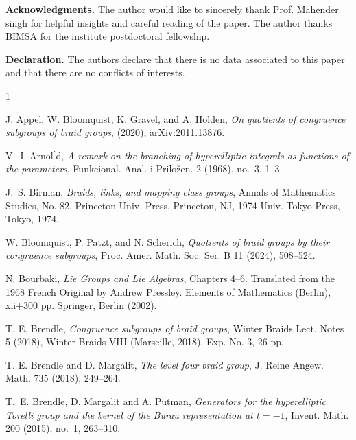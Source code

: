 \documentclass[12pt]{amsart}
\theoremstyle{definition}
\numberwithin{equation}{section}
\begin{document}
\medskip

\noindent\textbf{Acknowledgments.}
The author would like to sincerely thank Prof. Mahender singh for helpful insights and careful reading of the paper. The author thanks BIMSA for the institute postdoctoral fellowship.
\medskip



\noindent\textbf{Declaration.}
The authors declare that there is no data associated to this paper and that there are no conflicts of interests.
\medskip





\begin{thebibliography}{1}

 J. Appel, W. Bloomquist,  K. Gravel, and A. Holden, {\it On quotients of congruence subgroups of braid groups}, (2020), arXiv:2011.13876.

  V.~I. Arnol$^\prime$d, {\it A remark on the branching of hyperelliptic integrals as functions of the parameters}, Funkcional. Anal. i Prilo\v zen.  2 (1968), no.~3, 1--3.


 J.~S. Birman, {\it Braids, links, and mapping class groups}, Annals of Mathematics Studies, No. 82, Princeton Univ. Press, Princeton, NJ, 1974 Univ. Tokyo Press, Tokyo, 1974.

 W. Bloomquist, P. Patzt, and N. Scherich, {\it Quotients of braid groups by their congruence subgroups}, Proc. Amer. Math. Soc. Ser. B 11 (2024), 508--524.


 N. Bourbaki, {\it Lie Groups and Lie Algebras}, Chapters 4--6. Translated from the 1968 French Original by Andrew Pressley. Elements of Mathematics (Berlin), xii+300 pp. Springer, Berlin (2002).

 T. E. Brendle, {\it Congruence subgroups of braid groups}, Winter Braids Lect. Notes 5 (2018), Winter Braids VIII (Marseille, 2018), Exp. No. 3, 26 pp.

 T. E. Brendle and D. Margalit, {\it The level four braid group}, J. Reine Angew. Math. 735 (2018), 249--264.

 T.~E. Brendle, D. Margalit and A. Putman, {\it Generators for the hyperelliptic Torelli group and the kernel of the Burau representation at $t=-1$}, Invent. Math.  200 (2015), no.~1, 263--310.


\end{thebibliography}
\end{document}
